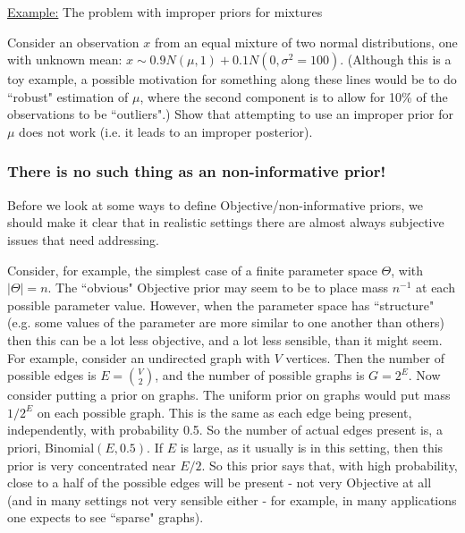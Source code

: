 \documentclass[12pt]{article}
\def\ni{\noindent}
\begin{document}
\ni\underline{Example:} The problem with improper priors for mixtures

Consider an observation $x$ from an equal mixture of two normal distributions, one with unknown mean: $x \sim 0.9 N(\mu,1) + 0.1 N(0,\sigma^2 = 100)$. (Although this is a toy example, a possible motivation for something along these lines would be to do ``robust" estimation of $\mu$, where the second component is to allow for 10\% of the observations to be ``outliers".)
Show that attempting to use an improper prior for $\mu$ does not work (i.e. it leads to an improper posterior).



\subsubsection{There is no such thing as an non-informative prior!}

Before we look at some ways to define Objective/non-informative priors, we should make it clear that in realistic settings there are almost always subjective issues that need addressing.

Consider, for example, the simplest case of
a  finite parameter space $\Theta$, with $|\Theta|=n$.  The
``obvious" Objective prior may seem to be to place mass $n^{-1}$ at each possible
parameter value. However, when the parameter space has ``structure" (e.g. some values of the parameter are more similar to one another than others) then this can be a lot less objective,
and a lot less sensible, than it might seem.
For example, consider an undirected graph with $V$ vertices. Then the number of possible edges is $E= {V\choose2}$, and the number of possible graphs is $G=2^E$. Now consider putting a prior on graphs. The uniform prior on graphs would put mass $1/2^E$ on each possible graph. This is the same as each edge being present, independently, with probability 0.5. So the number of actual edges present is, a priori, Binomial$(E, 0.5)$. If $E$ is large, as it usually is in this setting, then this prior is very concentrated near $E/2$. So this prior says that, with high probability, close to a half of the possible edges will be present - not very Objective at all (and in many settings not very sensible either - for example, in many applications one expects to see ``sparse" graphs).
\end{document}
